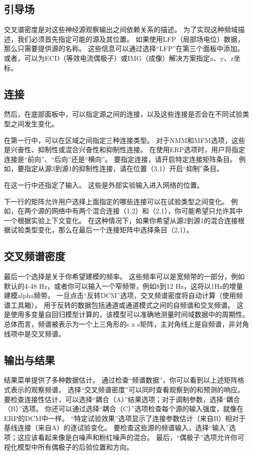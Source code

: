 \subsection{引导场}

交叉谱密度是对这些神经源观察输出之间依赖关系的描述。
为了实现这种频域描述，我们必须首先指定可能的源及其位置。
如果使用LFP（局部场电位）数据，那么只需要提供源的名称。
这些信息可以通过选择“LFP”在第三个面板中添加。
或者，可以为ECD（等效电流偶极子）或IMG（成像）解决方案指定x、y、z坐标。


\subsection{连接}

然后，在底部面板中，可以指定源之间的连接，以及这些连接是否会在不同试验类型之间发生变化。

在第一行中，可以在区域之间指定三种连接类型。
对于NMM和MFM选项，这些是兴奋性、抑制性或混合兴奋性和抑制性连接。
在使用ERP选项时，用户将指定连接是“前向”、“后向”还是“横向”。
要指定连接，请开启特定连接矩阵条目。
例如，要指定从源3到源1的抑制性连接，请在位置（3,1）开启“抑制”条目。

在这一行中还指定了输入。
这些是外部实验输入进入网络的位置。

下一行的矩阵允许用户选择上面指定的哪些连接可以在试验类型之间变化。
例如，在两个源的网络中有两个混合连接（1,2）和（2,1），你可能希望只允许其中一个根据实验上下文变化。
在这种情况下，如果你希望从源2到源1的混合连接根据试验类型变化，那么在最后一个连接矩阵中选择条目（2,1）。


\subsection{交叉频谱密度}

最后一个选择是关于你希望建模的频率。
这些频率可以是宽频带的一部分，例如默认的4-48 Hz，或者你可以输入一个窄频带，例如8到12 Hz，这将以1Hz的增量建模alpha频带。
一旦点击“反转DCM”选项，交叉频谱密度将自动计算（使用频谱工具箱）。
用于反转的数据包括通道或通道模式之间的自频谱和交叉频谱。
这是使用多变量自回归模型计算的，该模型可以准确地测量时间域数据中的周期性。
总体而言，频谱被表示为一个上三角形的s x s矩阵，主对角线上是自频谱，非对角线项中是交叉频谱。


\subsection{输出与结果}

结果菜单提供了多种数据估计。
通过检查“频谱数据”，你可以看到以上述矩阵格式表示的观察频谱。
选择“交叉频谱密度”可以同时查看观察到的和预测的响应。
要检查连接性估计，可以选择“耦合（A）”结果选项；对于调制参数，选择“耦合（B）”选项。
你还可以通过选择“耦合（C）”选项检查每个源的输入强度，就像在ERP的DCM中一样。
“特定试验效果”选项显示了连接参数估计（来自B）相对于基线连接（来自A）的逐试验变化。
要检查这些源的频谱输入，选择“输入”选项；这应该看起来像是白噪声和粉红噪声的混合。
最后，“偶极子”选项允许你可视化模型中所有偶极子的后验位置和方向。


